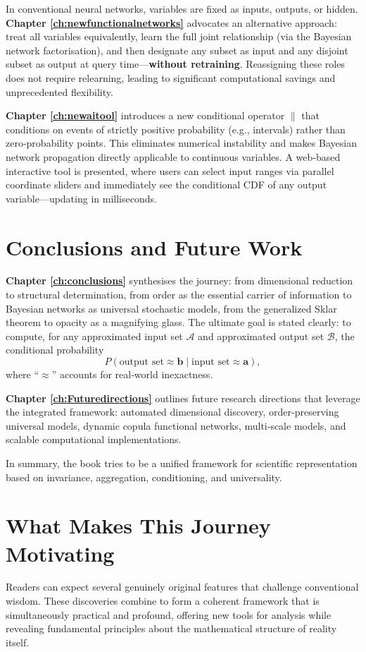 In conventional neural networks, variables are fixed as inputs, outputs, or hidden. \textbf{Chapter \ref{ch:newfunctionalnetworks}} advocates an alternative approach: treat all variables equivalently, learn the full joint relationship (via the Bayesian network factorisation), and then designate any subset as input and any disjoint subset as output at query time—\textbf{without retraining}. Reassigning these roles does not require relearning, leading to significant computational savings and unprecedented flexibility.

\textbf{Chapter \ref{ch:newaitool}} introduces a new conditional operator \(\|\) that conditions on events of strictly positive probability (e.g., intervals) rather than zero‑probability points. This eliminates numerical instability and makes Bayesian network propagation directly applicable to continuous variables. A web‑based interactive tool is presented, where users can select input ranges via parallel coordinate sliders and immediately see the conditional CDF of any output variable—updating in milliseconds.

\section{Conclusions and Future Work}
\textbf{Chapter \ref{ch:conclusions}} synthesises the journey: from dimensional reduction to structural determination, from order as the essential carrier of information to Bayesian networks as universal stochastic models, from the generalized Sklar theorem to opacity as a magnifying glass. The ultimate goal is stated clearly: to compute, for any approximated input set \(\mathcal{A}\) and approximated output set \(\mathcal{B}\), the conditional probability
\[
P(\text{output set} \approx \mathbf{b} \mid \text{input set} \approx \mathbf{a}),
\]
where “\(\approx\)” accounts for real‑world inexactness.

\textbf{Chapter \ref{ch:Futuredirections}} outlines future research directions that leverage the integrated framework: automated dimensional discovery, order‑preserving universal models, dynamic copula functional networks, multi‑scale models, and scalable computational implementations.

In summary, the book tries to be a unified framework for scientific representation based on invariance, aggregation, conditioning, and universality.

\section*{What Makes This Journey Motivating}
Readers can expect several genuinely original features that challenge conventional wisdom. These discoveries combine to form a coherent framework that is simultaneously practical and profound, offering new tools for analysis while revealing fundamental principles about the mathematical structure of reality itself.

